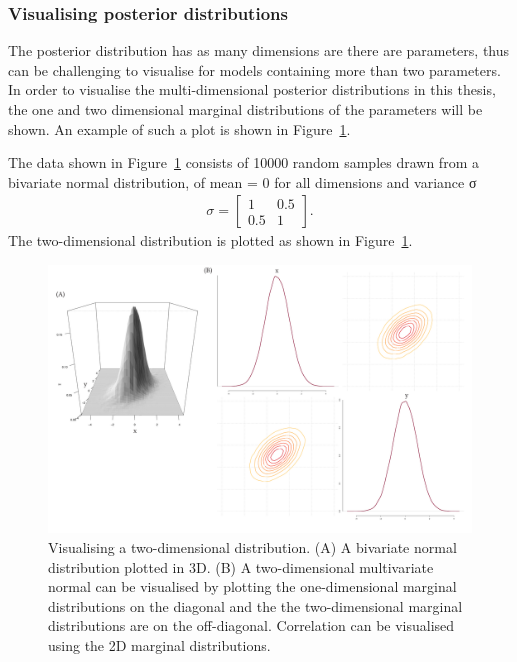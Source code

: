 \clearpage
\subsubsection{Visualising posterior distributions}

The posterior distribution has as many dimensions are there are parameters, thus can be challenging to visualise for models containing more than two parameters. In order to visualise the multi-dimensional posterior distributions in this thesis, the one and two dimensional marginal distributions of the parameters will be shown. An example of such a plot is shown in Figure~\ref{fig:exampl_post}. 

The data shown in Figure~\ref{fig:exampl_post} consists of 10000 random samples drawn from a bivariate normal distribution, of mean = 0 for all dimensions and variance σ
\begin{align*}
σ = \begin{bmatrix}
1 &0.5 \\ 
 0.5& 1  
\end{bmatrix}.
\end{align*}
\noindent The two-dimensional distribution is plotted as shown in Figure~\ref{fig:exampl_post}.

\begin{figure}[h]
    \begin{center}
    \includegraphics[width=1.1\textwidth]{../../chapters/chapterBackgr/images/example_posterior.pdf}
    \caption[Example of a posterior distribution plot]{Visualising a two-dimensional distribution. (A) A bivariate normal distribution plotted in 3D. (B) A two-dimensional multivariate normal can be visualised by plotting the one-dimensional marginal distributions on the diagonal and the the two-dimensional marginal distributions are on the off-diagonal. Correlation can be visualised using the 2D marginal distributions.}
    \label{fig:exampl_post}
    \end{center}
\end{figure}


